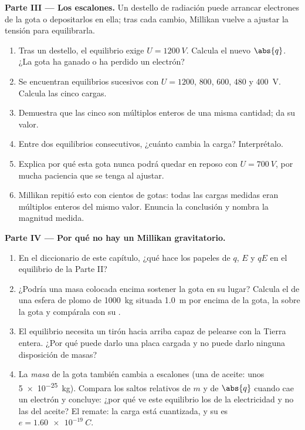 \begin{problem}
\medskip
\noindent\textbf{Parte III --- Los escalones.}
Un destello de radiación puede arrancar electrones de la gota o
depositarlos en ella; tras cada cambio, Millikan vuelve a ajustar la
tensión para equilibrarla.
\begin{enumerate}[resume]
  \item Tras un destello, el equilibrio exige $U = \qty{1200}{V}$.
        Calcula el nuevo $\abs{q}$. ¿La gota ha ganado o ha perdido un
        electrón?
  \item Se encuentran equilibrios sucesivos con $U = 1200$, $800$,
        $600$, $480$ y \qty{400}{V}. Calcula las cinco cargas.
  \item Demuestra que las cinco son múltiplos enteros de una misma
        cantidad; da su valor.
  \item Entre dos equilibrios consecutivos, ¿cuánto cambia la carga?
        Interprétalo.
  \item Explica por qué esta gota nunca podrá quedar en reposo con
        $U = \qty{700}{V}$, por mucha paciencia que se tenga al
        ajustar.
  \item Millikan repitió esto con cientos de gotas: todas las cargas
        medidas eran múltiplos enteros del mismo valor. Enuncia la
        conclusión y nombra la magnitud medida.
\end{enumerate}

\medskip
\noindent\textbf{Parte IV --- Por qué no hay un Millikan gravitatorio.}
\begin{enumerate}[resume]
  \item En el diccionario de este capítulo, ¿qué hace los papeles de
        $q$, $E$ y $qE$ en el equilibrio de la Parte II?
  \item ¿Podría una masa colocada encima sostener la gota en su lugar?
        Calcula el  de una esfera de plomo de \qty{1000}{kg}
        situada \qty{1.0}{m} por encima de la gota, la  sobre la
        gota y compárala con su .
  \item El equilibrio necesita un tirón hacia arriba capaz de pelearse
        con la Tierra entera. ¿Por qué puede darlo una placa cargada y
        no puede darlo ninguna disposición de masas?
  \item La \emph{masa} de la gota también cambia a escalones (una
         de aceite: unos \qty{5e-25}{kg}). Compara los saltos
        relativos de $m$ y de $\abs{q}$ cuando cae un electrón y
        concluye: ¿por qué ve este equilibrio los  de la
        electricidad y no las  del aceite? El remate: la carga
        está cuantizada, y su  es $e = \qty{1.60e-19}{C}$.
\end{enumerate}
\end{problem}
